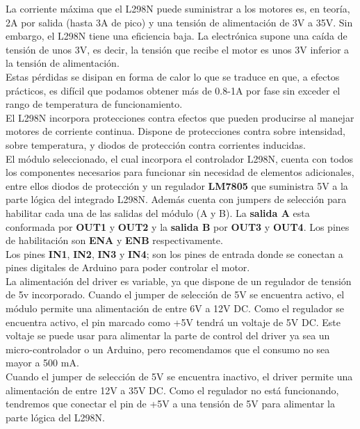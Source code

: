 La corriente máxima que el L298N puede suministrar a los motores es, en teoría, 2A por salida (hasta 3A de pico) y una tensión de alimentación de 3V a 35V. Sin embargo, el L298N tiene una 
eficiencia baja. La electrónica supone una caída de tensión de unos 3V, es decir, la tensión que recibe el motor es unos 3V inferior a la tensión de alimentación.\\

Estas pérdidas se disipan en forma de calor lo que se traduce en que, a efectos prácticos, es difícil que podamos obtener más de 0.8-1A por fase sin exceder el rango de temperatura de funcionamiento.\\

El L298N incorpora protecciones contra efectos que pueden producirse al manejar motores de corriente continua. Dispone de protecciones contra sobre intensidad, sobre temperatura, y diodos de protección
contra corrientes inducidas.\\

El módulo seleccionado, el cual incorpora el controlador L298N, cuenta con todos los componentes necesarios para funcionar sin necesidad de elementos adicionales, entre ellos diodos de protección
y un regulador \textbf{LM7805} que suministra 5V a la parte lógica del integrado L298N. Además cuenta con jumpers de selección para habilitar cada una de las salidas del módulo
(A y B). La \textbf{salida A} esta conformada por \textbf{OUT1} y \textbf{OUT2} y la \textbf{salida B} por \textbf{OUT3} y \textbf{OUT4}. Los pines de habilitación 
son \textbf{ENA} y \textbf{ENB} respectivamente.\\

Los pines \textbf{IN1}, \textbf{IN2}, \textbf{IN3} y \textbf{IN4}; son los pines de entrada donde se conectan a pines digitales de Arduino para poder controlar el motor.\\

La alimentación del driver es variable, ya que dispone de un regulador de tensión de 5v incorporado. Cuando el jumper de selección de 5V se encuentra activo, el módulo permite una 
alimentación de entre 6V a 12V DC. Como el regulador se encuentra activo, el pin marcado como +5V tendrá un voltaje de 5V DC. Este voltaje se puede usar para alimentar la parte de control del 
driver ya sea un micro-controlador o un Arduino, pero recomendamos que el consumo no sea mayor a 500 mA.\\

Cuando el jumper de selección de 5V se encuentra inactivo, el driver permite una alimentación de entre 12V a 35V DC. Como el regulador no está funcionando, tendremos que conectar el pin de +5V a una tensión de 5V para alimentar la parte 
lógica del L298N.\\


